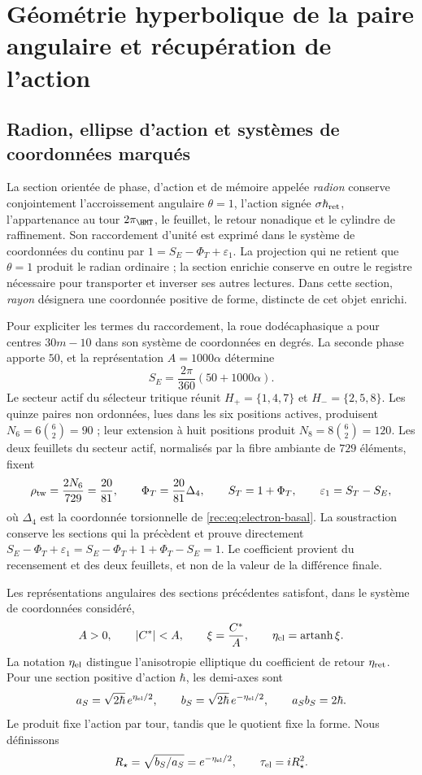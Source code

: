 \section{Géométrie hyperbolique de la paire angulaire et récupération de l'action}
\label{rec:radial}

\subsection{Radion, ellipse d’action et systèmes de coordonnées marqués}

La section orientée de phase, d’action et de mémoire appelée \emph{radion} conserve conjointement l’accroissement angulaire \(\theta=1\), l’action signée \(\sigma\hbar_{\rm ret}\), l’appartenance au tour \(2\pi_{\HMT}\), le feuillet, le retour nonadique et le cylindre de raffinement. Son raccordement d’unité est exprimé dans le système de coordonnées du continu par \(1=S_E-\Phi_T+\varepsilon_1\). La projection qui ne retient que \(\theta=1\) produit le radian ordinaire ; la section enrichie conserve en outre le registre nécessaire pour transporter et inverser ses autres lectures. Dans cette section, \emph{rayon} désignera une coordonnée positive de forme, distincte de cet objet enrichi.

Pour expliciter les termes du raccordement, la roue dodécaphasique a pour centres \(30m-10\) dans son système de coordonnées en degrés. La seconde phase apporte \(50\), et la représentation \(A=1000\alpha\) détermine
\[
 S_E=\frac{2\pi}{360}(50+1000\alpha).
\]
Le secteur actif du sélecteur tritique réunit \(H_+=\{1,4,7\}\) et \(H_-=\{2,5,8\}\). Les quinze paires non ordonnées, lues dans les six positions actives, produisent \(N_6=6\binom62=90\) ; leur extension à huit positions produit \(N_8=8\binom62=120\). Les deux feuillets du secteur actif, normalisés par la fibre ambiante de \(729\) éléments, fixent
\[
 \rho_{\rm tw}=\frac{2N_6}{729}=\frac{20}{81},\qquad
 \Phi_T=\frac{20}{81}\Delta_4,\qquad
 S_T=1+\Phi_T,\qquad \varepsilon_1=S_T-S_E,
\]
où \(\Delta_4\) est la coordonnée torsionnelle de \eqref{rec:eq:electron-basal}. La soustraction conserve les sections qui la précèdent et prouve directement
\(S_E-\Phi_T+\varepsilon_1=S_E-\Phi_T+1+\Phi_T-S_E=1\).
Le coefficient provient du recensement et des deux feuillets, et non de la valeur de la différence finale.

Les représentations angulaires des sections précédentes satisfont, dans le système de coordonnées considéré,
\[
 A>0,\qquad |C^*|<A,\qquad
 \xi=\frac{C^*}{A},\qquad \eta_{\rm el}=\operatorname{artanh}\xi.
\]
La notation \(\eta_{\rm el}\) distingue l'anisotropie elliptique du coefficient de retour \(\eta_{\rm ret}\). Pour une section positive d'action \(\hbar\), les demi-axes sont
\begin{equation}
 a_S=\sqrt{2\hbar}\,e^{\eta_{\rm el}/2},\qquad
 b_S=\sqrt{2\hbar}\,e^{-\eta_{\rm el}/2},\qquad a_Sb_S=2\hbar.
 \label{rec:eq:elipse}
\end{equation}
Le produit fixe l’action par tour, tandis que le quotient fixe la forme. Nous définissons
\[
 R_\star=\sqrt{b_S/a_S}=e^{-\eta_{\rm el}/2},\qquad
 \tau_{\rm el}=iR_\star^2.
\]

